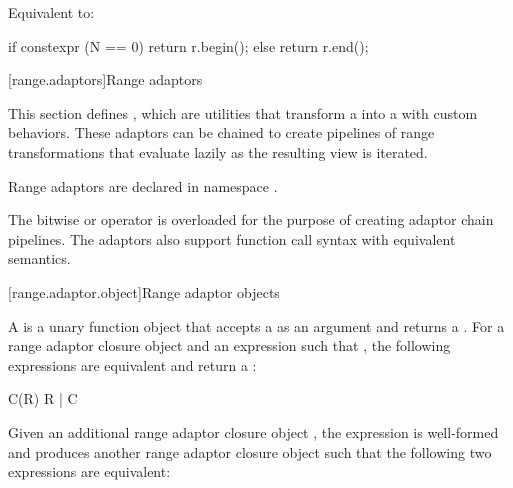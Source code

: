 {\begin{itemdescr}
\pnum
\effects Equivalent to:
\begin{codeblock}
if constexpr (N == 0)
  return r.begin();
else
  return r.end();
\end{codeblock}
\end{itemdescr}

[range.adaptors]{Range adaptors}

\pnum
This section defines , which are utilities that transform a
 into a  with custom behaviors. These
adaptors can be chained to create pipelines of range transformations that
evaluate lazily as the resulting view is iterated.

\pnum
Range adaptors are declared in namespace .

\pnum
The bitwise or operator is overloaded for the purpose of creating adaptor chain
pipelines. The adaptors also support function call syntax with equivalent
semantics.

\pnum
\begin{example}
\end{example}

[range.adaptor.object]{Range adaptor objects}

\pnum
A  is a unary function object that accepts
a  as an argument and returns a . For
a range adaptor closure object  and an expression  such that
   , the following
expressions are equivalent and return a :

\begin{codeblock}
C(R)
R | C
\end{codeblock}

Given an additional range adaptor closure object ,
the expression  is well-formed and produces another range adaptor
closure object such that the following two expressions are equivalent:

}
